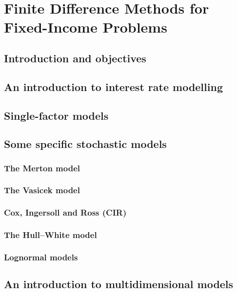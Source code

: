 \chapter{Finite Difference Methods for Fixed-Income Problems}

\section{Introduction and objectives}

\section{An introduction to interest rate modelling}

\section{Single-factor models}

\section{Some specific stochastic models}

\subsection{The Merton model}

\subsection{The Vasicek model}

\subsection{Cox, Ingersoll and Ross (CIR)}

\subsection{The Hull–White model}

\subsection{Lognormal models}

\section{An introduction to multidimensional models}

